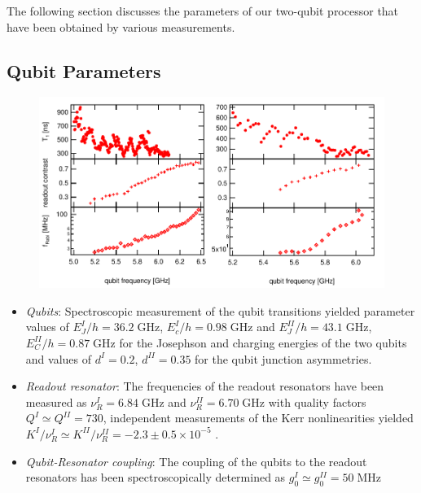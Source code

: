 The following section discusses the parameters of our two-qubit processor that have been obtained by various measurements.

\subsection{Qubit Parameters}

\begin{figure}[ht!]
   \centering
	 \includegraphics[width=1\textwidth]{"./data/ct5/qubits - parameter surveys/qubit parameters"}
	 \caption[]{}
	 \label{fig:QubitParameters}
\end{figure}

\begin{itemize}
\item \textit{Qubits}: Spectroscopic measurement of the qubit transitions yielded parameter values of $E_J^I / h = 36.2\; \mathrm{GHz}$, $E_c^I / h = 0.98 \; \mathrm{GHz}$ and $E_J^{II} / h = 43.1\; \mathrm{GHz}$, $E_C^{II} / h = 0.87 \; \mathrm{GHz}$ for the Josephson and charging energies of the two qubits and values of $d^I = 0.2$, $d^{II} =  0.35$ for the qubit junction asymmetries.
\item \textit{Readout resonator}: The frequencies of the readout resonators have been measured as $\nu_R^I = 6.84 \; \mathrm{GHz}$ and $\nu_R^{II} = 6.70 \; \mathrm{GHz}$ with quality factors $Q^I \simeq Q^{II} = 730$, independent measurements of the Kerr nonlinearities yielded $K^I / \nu_R^I \simeq K^{II} / \nu_R^{II} = -2.3\pm 0.5 \times 10^{-5}$ .
\item \textit{Qubit-Resonator coupling}: The coupling of the qubits to the readout resonators has been spectroscopically determined as $g_0^I \simeq g_0^{II} = 50 \; \mathrm{MHz}$
\end{itemize}

